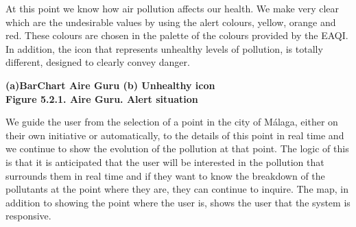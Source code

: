 At this point we know how air pollution affects our health.
We make very clear which are the undesirable values by using the alert colours, yellow, orange and red.
These colours are chosen in the palette of the colours provided by the EAQI.
In addition, the icon that represents unhealthy levels of pollution, is totally different, designed to clearly convey danger. \\

\begin{center}
    \bf{ (a)BarChart Aire Guru (b) Unhealthy icon\\
    
    Figure 5.2.1. Aire Guru. Alert situation}
\end{center} 

We guide the user from the selection of a point in the city of Málaga, either on their own initiative
or automatically, to the details of this point in real time and we continue to show the evolution of the pollution at that point.
The logic of this is that it is anticipated that the user will be interested in the pollution that surrounds them in real time and if
they want to know the breakdown of the pollutants at the point where they are, they can continue to inquire.
The map, in addition to showing the point where the user is, shows the user that the system is responsive.